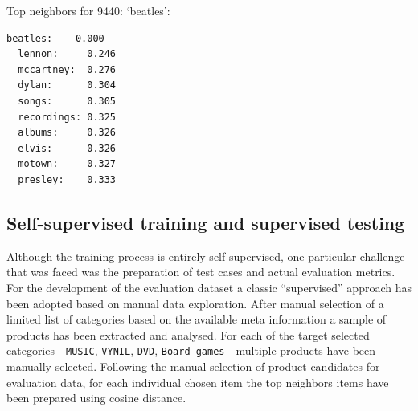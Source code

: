 \documentclass[11pt]{article}
\begin{document}
    Top neighbors for 9440: `beatles':

    

\begin{Verbatim}[commandchars=\\\{\},fontsize=\footnotesize]
  beatles:    0.000
  lennon:     0.246
  mccartney:  0.276
  dylan:      0.304
  songs:      0.305
  recordings: 0.325
  albums:     0.326
  elvis:      0.326
  motown:     0.327
  presley:    0.333

\end{Verbatim}

    \hypertarget{self-supervised-training-and-supervised-testing}{%
\subsection{Self-supervised training and supervised
testing}\label{self-supervised-training-and-supervised-testing}}

Although the training process is entirely self-supervised, one
particular challenge that was faced was the preparation of test cases
and actual evaluation metrics. For the development of the evaluation
dataset a classic ``supervised'' approach has been adopted based on
manual data exploration. After manual selection of a limited list of
categories based on the available meta information a sample of products
has been extracted and analysed. For each of the target selected
categories - \texttt{MUSIC}, \texttt{VYNIL}, \texttt{DVD},
\texttt{Board-games} - multiple products have been manually selected.
Following the manual selection of product candidates for evaluation
data, for each individual chosen item the top neighbors items have been
prepared using cosine distance.
\end{document}
